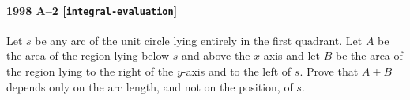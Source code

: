 \paragraph{1998 A--2 \textnormal{[\texttt{integral-evaluation}]}}
Let $s$ be any arc of the unit circle lying entirely in the first
quadrant. Let $A$ be the area of the region lying below $s$ and
above the $x$-axis and let $B$ be the area of the region lying to the
right of the $y$-axis and to the left of $s$. Prove that $A+B$ depends
only on the arc length, and not on the position, of $s$.
